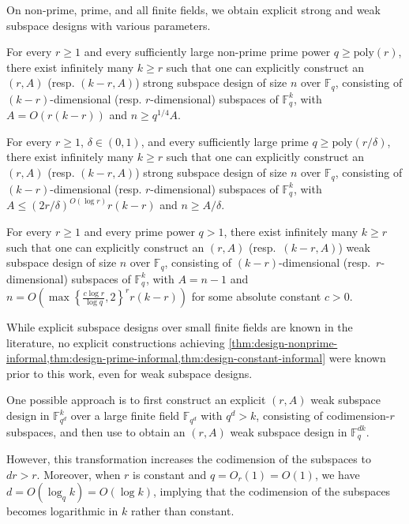 \documentclass[11pt]{article}
\newcommand{\F}{\mathbb{F}}
\newcommand{\poly}{\mathrm{poly}}
\begin{document}
On non-prime, prime, and all finite fields, we obtain explicit strong and weak subspace designs with various parameters.

\begin{theorem}\label{thm:design-nonprime-informal}
For every $r\ge 1$ and every sufficiently large non-prime prime power $q\ge \poly(r)$, there exist infinitely many $k\ge r$ such that one can explicitly construct an $(r,A)$ (resp. $(k-r, A)$) strong subspace design of size $n$ over $\F_q$, consisting of $(k-r)$-dimensional (resp. $r$-dimensional) subspaces of $\F_q^k$, with $A=O(r(k-r))$ and $n\ge  q^{1/4} A$.
\end{theorem}

\begin{theorem}\label{thm:design-prime-informal}
For every $r\ge 1$, $\delta\in (0,1)$, and every sufficiently large prime $q\ge \poly(r/\delta)$, there exist infinitely many $k\ge r$ such that one can explicitly construct an $(r,A)$ (resp. $(k-r, A)$) strong subspace design of size $n$ over $\F_q$, consisting of $(k-r)$-dimensional (resp. $r$-dimensional) subspaces of $\F_q^k$, with $A\leq (2r/\delta)^{O(\log r)} r(k-r)$ and $n\ge A/\delta$.
\end{theorem}

\begin{theorem}\label{thm:design-constant-informal}
For every $r\ge 1$ and every prime power $q>1$, there exist infinitely many $k\ge r$ such that one can explicitly construct an $(r,A)$ (resp.\ $(k-r,A)$) weak subspace design of size $n$ over $\F_q$, consisting of $(k-r)$-dimensional (resp.\ $r$-dimensional) subspaces of $\F_q^k$, with $A=n-1$ and
$n=O\!\left(\max\left\{\frac{c\log r}{\log q},2\right\}^r r(k-r)\right)$
for some absolute constant $c>0$.
\end{theorem}

\begin{remark}
While explicit subspace designs over small finite fields are known in the literature, no explicit constructions achieving \cref{thm:design-nonprime-informal,thm:design-prime-informal,thm:design-constant-informal} were known prior to this work, even for weak subspace designs. 

One possible approach is to first construct an explicit $(r,A)$ weak subspace design in $\F_{q^d}^k$ over a large finite field $\F_{q^d}$ with $q^d>k$, consisting of codimension-$r$ subspaces, and then use \cite[Lemma~8]{guruswami2016explicit} to obtain an $(r,A)$ weak subspace design in $\F_q^{dk}$. 

However, this transformation increases the codimension of the subspaces to $dr>r$. Moreover, when $r$ is constant and $q=O_r(1)=O(1)$, we have $d=O(\log_q k)=O(\log k)$, implying that the codimension of the subspaces becomes logarithmic in $k$ rather than constant. 
\end{remark}
\end{document}

